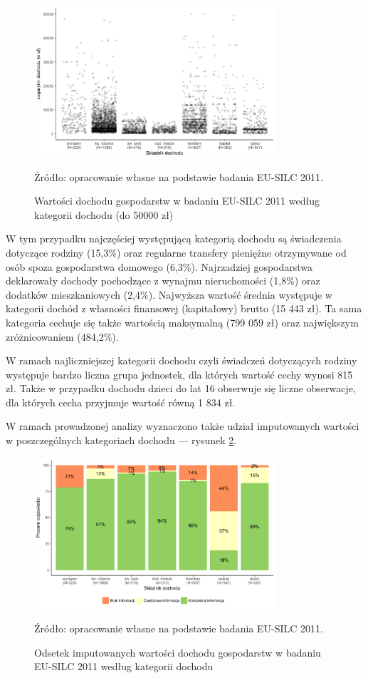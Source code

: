 \begin{figure}[ht]
\centering
\includegraphics[width=0.8\textwidth]{04_wykresy/dochod_gospodarstw-1.png}
\caption{Wartości dochodu gospodarstw w badaniu EU-SILC 2011 według kategorii dochodu (do 50000 zł)}
\small{Źródło: opracowanie własne na podstawie badania EU-SILC 2011.}
\label{fig:dochod_gosp}
\end{figure}

W tym przypadku najczęściej występującą kategorią dochodu są świadczenia dotyczące rodziny (15,3\%) oraz regularne transfery pieniężne otrzymywane od osób spoza gospodarstwa domowego (6,3\%). Najrzadziej gospodarstwa deklarowały dochody pochodzące z wynajmu nieruchomości (1,8\%) oraz dodatków mieszkaniowych (2,4\%). Najwyższa wartość średnia występuje w kategorii dochód z własności finansowej (kapitałowy) brutto (15 443 zł). Ta sama kategoria cechuje się także wartością maksymalną (799 059 zł) oraz największym zróżnicowaniem (484,2\%).

W ramach najliczniejszej kategorii dochodu czyli świadczeń dotyczących rodziny występuje bardzo liczna grupa jednostek, dla których wartość cechy wynosi 815 zł. Także w przypadku dochodu dzieci do lat 16 obserwuje się liczne obserwacje, dla których cecha przyjmuje wartość równą 1 834 zł.

W ramach prowadzonej analizy wyznaczono także udział imputowanych wartości w poszczególnych kategoriach dochodu --- rysunek \ref{fig:dochod_gosp_imp}.

\begin{figure}[htp]
\centering
\includegraphics[width=0.8\textwidth]{04_wykresy/dochod_gospodarstw_imputacja-1.pdf}
\caption{Odsetek imputowanych wartości dochodu gospodarstw w badaniu EU-SILC 2011 według kategorii dochodu}
\small{Źródło: opracowanie własne na podstawie badania EU-SILC 2011.}
\label{fig:dochod_gosp_imp}
\end{figure}

